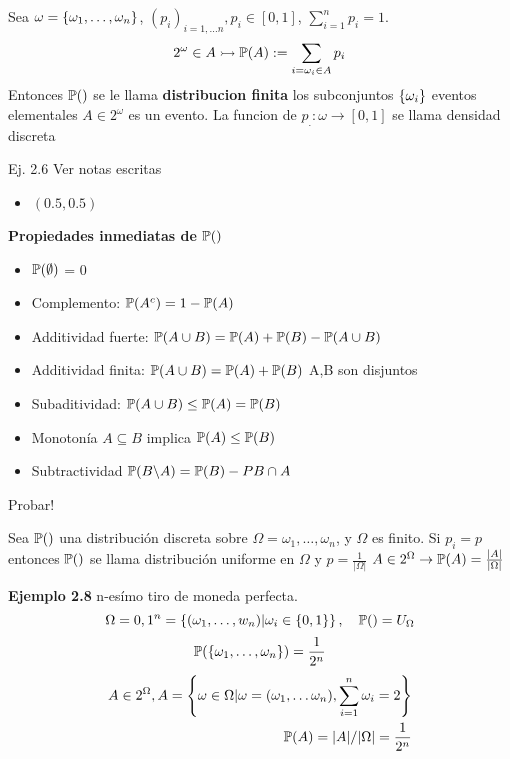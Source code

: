 \begin{define}
	Sea $ \omega = \left\lbrace  \omega_1, \ldots, \omega_n \right\rbrace $, $(p_i)_{i=1, \ldots n}, p_i \in  [0,1] $, $\sum_{i =1}^{n} p_i =1 $. 
	\begin{align*}
	2^{\omega} \in A \rightarrowtail \mathbb{P}(A) := \sum_{i = \omega_i \in A} p_i
	\end{align*}
	Entonces $ \mathbb{P}() $ se le llama \textbf{distribucion finita} los subconjuntos $ \left\lbrace  \omega_i \right\rbrace $ eventos elementales $A \in 2^{\omega} $ es un evento. La funcion de $p_{.}: \omega \rightarrow [0,1] $ se llama densidad discreta
\end{define}
Ej. 2.6
Ver notas escritas
\begin{itemize}
	\item $(0.5, 0.5)$
\end{itemize}
\begin{lema}
	\textbf{Propiedades inmediatas de $ \mathbb{P}() $} 
	\begin{itemize}
		\item $\mathbb{P}(\emptyset)$ = 0
		\item Complemento: $ \mathbb{P}(A^{c}) = 1 - \mathbb{P}(A)$
		\item Additividad fuerte: $ \mathbb{P}( A \cup B) = \mathbb{P}(A) + \mathbb{P}(B) - \mathbb{P}(A \cup B) $
		\item Additividad finita: $ \mathbb{P}(A \cup B) = \mathbb{P}(A) + \mathbb{P}(B)$ A,B son disjuntos
		\item Subaditividad: $ \mathbb{P}(A \cup B) \leq \mathbb{P}(A) = \mathbb{P}(B)$
		\item Monotonía $ A \subseteq B $ implica $ \mathbb{P}(A) \leq \mathbb{P}(B) $
		\item Subtractividad $\mathbb{P}(B \backslash A) = \mathbb{P}(B) - P{B \cap A}$
		\end{itemize}
		
\end{lema}
Probar!
\begin{define}
	Sea $ \mathbb{P}() $ una distribución discreta sobre $ \Omega = {\omega_1, \ldots, \omega_n} $, y $ \Omega $ es finito. Si $ p_i = p $ entonces $ \mathbb{P}() $ se llama distribución uniforme en $ \Omega $ y $ p = \frac{1}{| \Omega |} $ 
	$ A \in 2^{\Omega }  \rightarrow \mathbb{P}(A) = \frac{|A|}{|\Omega|} $ 
\end{define}
\textbf{Ejemplo 2.8} n-esímo tiro de moneda perfecta.
\[ \Omega = {0,1}^n = \left\lbrace (\omega_1,\ldots, w_n) | \omega_i \in \left\lbrace 0,1 \right\rbrace \right\rbrace, \quad \mathbb{P}() = U_{\Omega} \]
\begin{align*}
\mathbb{P}(\left\lbrace \omega_1, \ldots, \omega_n \right\rbrace) = \frac{1}{2^n}
\end{align*}
\begin{align*}
A \in 2^{\Omega}, A = \left\lbrace \omega\in \Omega | \omega = (\omega_1, \ldots \omega_n), \sum_{i=1}^{n} \omega_i = 2 \right\rbrace \\
\mathbb{P}(A) = |A|/|\Omega| = \frac{1}{2^n}
\end{align*}
